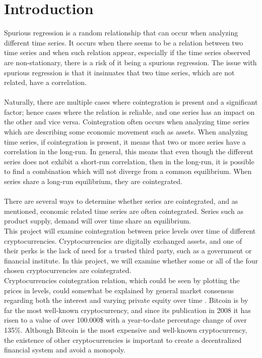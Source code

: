 \chapter{Introduction}
Spurious regression is a random relationship that can occur when analyzing different time series. It occurs when there seems to be a relation between two time series and when such relation appear, especially if the time series observed are non-stationary, there is a risk of it being a spurious regression. The issue with spurious regression is that it insinuates that two time series, which are not related, have a correlation.\\\\
\noindent Naturally, there are multiple cases where cointegration is present and a significant factor; hence cases where the relation is reliable, and one series has an impact on the other and vice versa. Cointegration often occurs when analyzing time series which are describing some economic movement such as assets. When analyzing time series, if cointegration is present, it means that two or more series have a correlation in the long-run. In general, this means that even though the different series does not exhibit a short-run correlation, then in the long-run, it is possible to find a combination which will not diverge from a common equilibrium. When series share a long-run equilibrium, they are cointegrated\cite{Intro_cointegration}.\\\\
There are several ways to determine whether series are cointegrated, and as mentioned, economic related time series are often cointegrated. Series such as product supply, demand will over time share an equilibrium.\\
This project will examine cointegration between price levels over time of different cryptocurrencies. Cryptocurrencies are digitally exchanged assets, and one of their perks is the lack of need for a trusted third party, such as a government or financial institute. In this project, we will examine whether some or all of the four chosen cryptocurrencies are cointegrated.\\
Cryptocurrencies cointegration relation, which could be seen by plotting the prices in levels, could somewhat be explained by general market consensus regarding both the interest and varying private equity over time \cite{Coinmarket}. 
Bitcoin is by far the most well-known cryptocurrency, and since its publication in 2008 it has risen to a value of over 100.000\$ with a year-to-date percentage change of over 135\%. Although Bitcoin is the most expensive and well-known cryptocurrency, the existence of other cryptocurrencies is important to create a decentralized financial system and avoid a monopoly.\\
